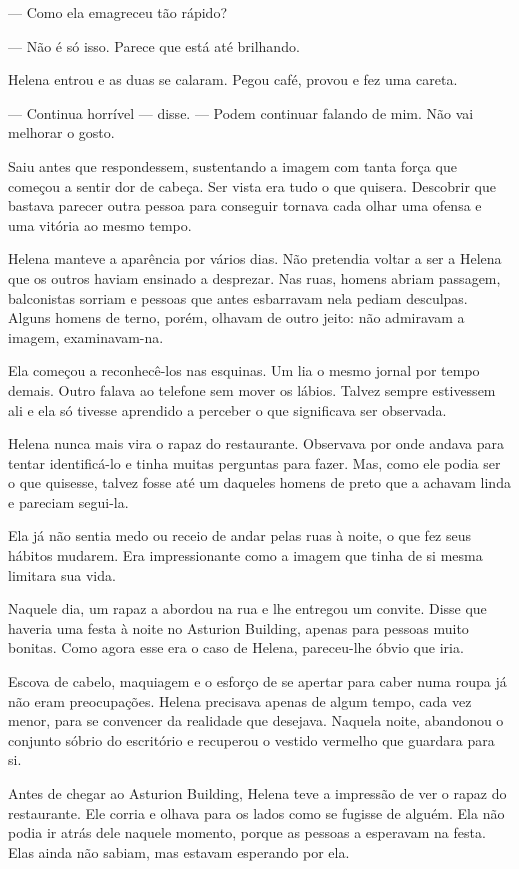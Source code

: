 — Como ela emagreceu tão rápido?

— Não é só isso. Parece que está até brilhando.

Helena entrou e as duas se calaram. Pegou café, provou e fez uma careta.

— Continua horrível — disse. — Podem continuar falando de mim. Não vai melhorar o gosto.

Saiu antes que respondessem, sustentando a imagem com tanta força que começou a sentir dor de cabeça. Ser vista era tudo o que quisera. Descobrir que bastava parecer outra pessoa para conseguir tornava cada olhar uma ofensa e uma vitória ao mesmo tempo.

Helena manteve a aparência por vários dias. Não pretendia voltar a ser a Helena que os outros haviam ensinado a desprezar. Nas ruas, homens abriam passagem, balconistas sorriam e pessoas que antes esbarravam nela pediam desculpas. Alguns homens de terno, porém, olhavam de outro jeito: não admiravam a imagem, examinavam-na.

Ela começou a reconhecê-los nas esquinas. Um lia o mesmo jornal por tempo demais. Outro falava ao telefone sem mover os lábios. Talvez sempre estivessem ali e ela só tivesse aprendido a perceber o que significava ser observada.

Helena nunca mais vira o rapaz do restaurante. Observava por onde andava para tentar identificá-lo e tinha muitas perguntas para fazer. Mas, como ele podia ser o que quisesse, talvez fosse até um daqueles homens de preto que a achavam linda e pareciam segui-la.

Ela já não sentia medo ou receio de andar pelas ruas à noite, o que fez seus hábitos mudarem. Era impressionante como a imagem que tinha de si mesma limitara sua vida.

Naquele dia, um rapaz a abordou na rua e lhe entregou um convite. Disse que haveria uma festa à noite no Asturion Building, apenas para pessoas muito bonitas. Como agora esse era o caso de Helena, pareceu-lhe óbvio que iria.

Escova de cabelo, maquiagem e o esforço de se apertar para caber numa roupa já não eram preocupações. Helena precisava apenas de algum tempo, cada vez menor, para se convencer da realidade que desejava. Naquela noite, abandonou o conjunto sóbrio do escritório e recuperou o vestido vermelho que guardara para si.

Antes de chegar ao Asturion Building, Helena teve a impressão de ver o rapaz do restaurante. Ele corria e olhava para os lados como se fugisse de alguém. Ela não podia ir atrás dele naquele momento, porque as pessoas a esperavam na festa. Elas ainda não sabiam, mas estavam esperando por ela.


